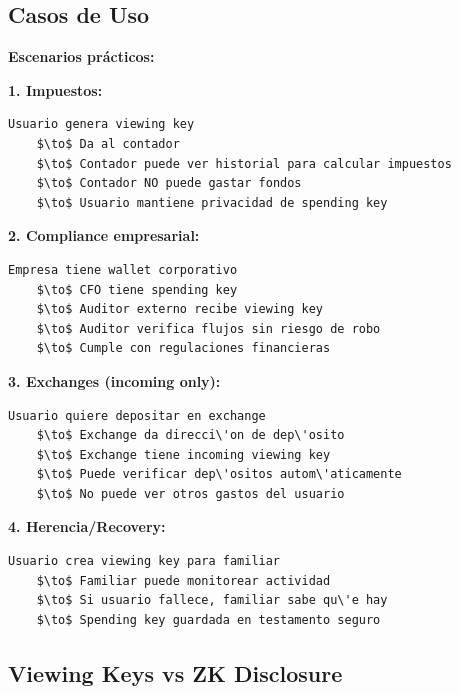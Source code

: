 \documentclass[11pt,a4paper,twoside]{book}
\begin{document}
\subsection{Casos de Uso}

\begin{keyidea}
\textbf{Escenarios pr\'acticos:}

\textbf{1. Impuestos:}
\begin{verbatim}
Usuario genera viewing key
    $\to$ Da al contador
    $\to$ Contador puede ver historial para calcular impuestos
    $\to$ Contador NO puede gastar fondos
    $\to$ Usuario mantiene privacidad de spending key
\end{verbatim}

\textbf{2. Compliance empresarial:}
\begin{verbatim}
Empresa tiene wallet corporativo
    $\to$ CFO tiene spending key
    $\to$ Auditor externo recibe viewing key
    $\to$ Auditor verifica flujos sin riesgo de robo
    $\to$ Cumple con regulaciones financieras
\end{verbatim}

\textbf{3. Exchanges (incoming only):}
\begin{verbatim}
Usuario quiere depositar en exchange
    $\to$ Exchange da direcci\'on de dep\'osito
    $\to$ Exchange tiene incoming viewing key
    $\to$ Puede verificar dep\'ositos autom\'aticamente
    $\to$ No puede ver otros gastos del usuario
\end{verbatim}

\textbf{4. Herencia/Recovery:}
\begin{verbatim}
Usuario crea viewing key para familiar
    $\to$ Familiar puede monitorear actividad
    $\to$ Si usuario fallece, familiar sabe qu\'e hay
    $\to$ Spending key guardada en testamento seguro
\end{verbatim}
\end{keyidea}

\subsection{Viewing Keys vs ZK Disclosure}
\end{document}
